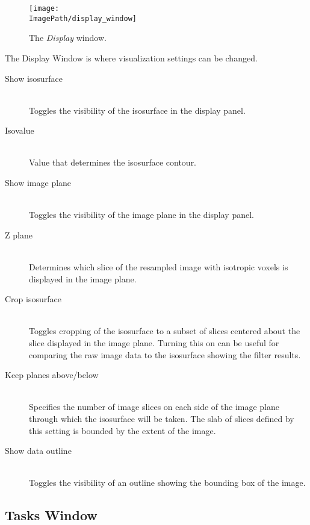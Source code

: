 \documentclass[11pt,titlepage,twoside]{article}
\begin{document}
\begin{figure}[htbp] %
   \centering
   \texttt{[image: \\ImagePath/display\_window]} 
   \caption{The \emph{Display} window.}
   \label{fig:DisplayWindow}
\end{figure}

The Display Window is where visualization settings can be changed.

\begin{description}

\item[Show isosurface] \hfill \\
Toggles the visibility of the isosurface in the display panel.

\item[Isovalue] \hfill \\
Value that determines the isosurface contour.

\item[Show image plane] \hfill \\
Toggles the visibility of the image plane in the display panel.

\item[Z plane] \hfill \\
Determines which slice of the resampled image with isotropic voxels is displayed in the image plane.

\item[Crop isosurface] \hfill \\
Toggles cropping of the isosurface to a subset of slices centered about the slice displayed in the image plane. Turning this on can be useful for comparing the raw image data to the isosurface showing the filter results.

\item[Keep planes above/below] \hfill \\
Specifies the number of image slices on each side of the image plane through which the isosurface will be taken. The slab of slices defined by this setting is bounded by the extent of the image.

\item[Show data outline] \hfill \\
Toggles the visibility of an outline showing the bounding box of the image.

\end{description}

\subsection{Tasks Window}
\end{document}
